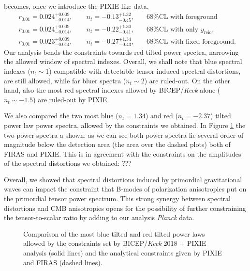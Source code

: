 becomes, once we introduce the PIXIE-like data,
\begin{align*}
    &r_{0.01}=0.024^{+0.009}_{-0.014} ,\qquad n_t=-0.13^{+1.32}_{-0.45},\quad &\text{68\%CL with foreground }\\
    &r_{0.01}=0.024^{+0.009}_{-0.014} ,\qquad n_t=-0.22^{+1.30}_{-0.41},\quad &\text{68\%CL with only }y_\text{reio},\\
    &r_{0.01}=0.023^{+0.009}_{-0.014} ,\qquad n_t=-0.27^{+1.34}_{-0.43},\quad &\text{68\%CL with fixed foreground. }
\end{align*}
Our analysis bends the constraints towards red tilted power spectra, narrowing the allowed window of spectral indexes. Overall, we shall note that blue spectral indexes ($n_t\sim1$) compatible with detectable tensor-induced spectral distortions, are still allowed, while far bluer spectra ($n_t\sim2$) are ruled-out. On the other hand, also the most red spectral indexes allowed by BICEP/\emph{Keck} alone ($n_t\sim-1.5$) are ruled-out by PIXIE.

We also compared the two most blue ($n_t=1.34$) and red ($n_t=-2.37$) tilted power law power spectra, allowed by the constraints we obtained. In Figure \ref{fig:analy_const_BK18} the two power spectra a shown: as we can see both power spectra lie several order of magnitude below the detection area (the area over the dashed plots) both of FIRAS and PIXIE. This is in agreement with the constraints on the amplitudes of the spectral distortions we obtained: ??? 

Overall, we showed that spectral distortions induced by primordial gravitational waves can impact the constraint that B-modes of polarization anisotropies put on the primordial tensor power spectrum.
This strong synergy between spectral distortions and CMB anisotropies opens for the possibility of further constraining the tensor-to-scalar ratio by adding to our analysis \textit{Planck} data. 
\begin{figure}
    \centering
{}
\caption{Comparison of the most blue tilted and red tilted power laws allowed  by the constraints set by BICEP/\emph{Keck} 2018 + PIXIE analysis (solid lines) and the analytical constraints given by PIXIE and FIRAS (dashed lines).}
\label{fig:analy_const_BK18}
\end{figure}
